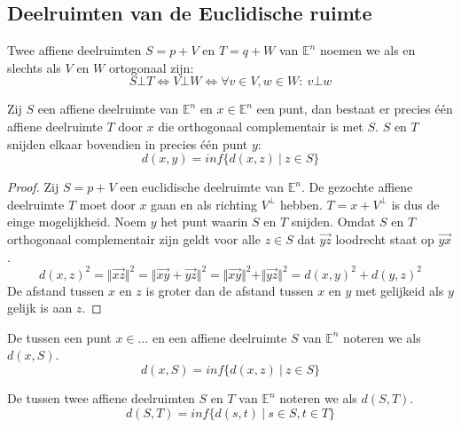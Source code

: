 \documentclass[main.tex]{subfiles}
\begin{document}
\subsection{Deelruimten van de Euclidische ruimte}
\label{sec:deelruimten-van-de}

\begin{de}
  Twee affiene deelruimten $S=p+V$ en $T=q+W$ van $\mathbb{E}^{n}$ noemen we  als en slechts als $V$ en $W$ ortogonaal zijn:
  \[ S \bot T \Leftrightarrow V \bot W \Leftrightarrow \forall v \in V, w \in W:\ v \bot w \]
\end{de}

\begin{st}
  Zij $S$ een affiene deelruimte van $\mathbb{E}^{n}$ en $x\in \mathbb{E}^{n}$ een punt, dan bestaat er precies \'e\'en affiene deelruimte $T$ door $x$ die orthogonaal complementair is met $S$.
  $S$ en $T$ snijden elkaar bovendien in precies \'e\'en punt $y$:
  \[ d(x,y) = inf\{ d(x,z) \ |\ z \in S  \} \]

  \begin{proof}
    Zij $S=p+V$ een euclidische deelruimte van $\mathbb{E}^{n}$.
    De gezochte affiene deelruimte $T$ moet door $x$ gaan en als richting $V^{\bot}$ hebben.
    $T=x+V^{\bot}$ is dus de einge mogelijkheid.
    Noem $y$ het punt waarin $S$ en $T$ snijden.
    Omdat $S$ en $T$ orthogonaal complementair zijn geldt voor alle $z\in S$ dat $\overrightarrow{yz}$ loodrecht staat op $\overrightarrow{yx}$.
    \[ d(x,z)^{2} = \Vert \overrightarrow{xz} \Vert^{2} = \Vert \overrightarrow{xy} + \overrightarrow{yz} \Vert^{2} = \Vert \overrightarrow{xy} \Vert^{2} + \Vert \overrightarrow{yz} \Vert^{2} = d(x,y)^{2} + d(y,z)^{2} \]
    De afstand tussen $x$ en $z$ is groter dan de afstand tussen $x$ en $y$ met gelijkeid als $y$ gelijk is aan $z$.
  \end{proof}
\end{st}

\begin{de}
  De  tussen een punt $x\in ...$ en een affiene deelruimte $S$ van $\mathbb{E}^{n}$ noteren we als $d(x,S)$.
  \[ d(x,S) = inf\{ d(x,z)\ |\ z \in S \} \]
\end{de}

\begin{de}
  De  tussen twee affiene deelruimten $S$ en $T$ van $\mathbb{E}^{n}$ noteren we als $d(S,T)$.
  \[ d(S,T) = inf\{ d(s,t) \ |\ s\in S, t\in T \} \]
\end{de}
\end{document}

